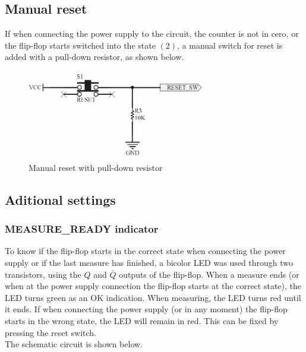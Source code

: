 \subsection*{Manual reset}

If when connecting the power supply to the circuit, the counter is not in cero, or the flip-flop starts 
switched into the state $(2)$, a manual switch for reset is added with a pull-down resistor, as shown below.

\begin{figure}[H]
    \begin{centering}
    \includegraphics[width=0.7\textwidth]{pullDown_Switch}
    \par\end{centering}
    \caption{Manual reset with pull-down resistor}
\end{figure}

\subsection*{Aditional settings}
\subsubsection*{MEASURE\_READY indicator}

To know if the flip-flop starts in the correct state when connecting the power supply or 
if the last measure has finished, 
a bicolor LED was used through two transistors, using the $Q$ and $\overline{Q}$ outputs 
of the flip-flop. When a measure ends (or when at the power supply connection the flip-flop starts
at the correct state), the LED turns green as an OK indication. When measuring, the LED turns red until
it ends. If when connecting the power supply (or in any moment) the flip-flop starts in the 
wrong state, the LED will remain in red. This can be fixed by pressing the reset switch.\\
The schematic circuit is shown below.

